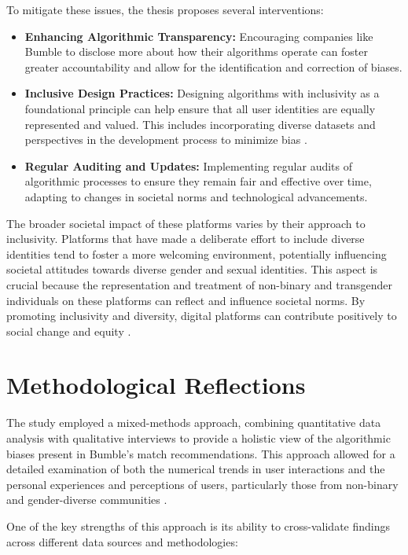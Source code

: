To mitigate these issues, the thesis proposes several interventions:
\begin{itemize}
    \item \textbf{Enhancing Algorithmic Transparency:} Encouraging companies like Bumble to disclose more about how their algorithms operate can foster greater accountability and allow for the identification and correction of biases.
    \item \textbf{Inclusive Design Practices:} Designing algorithms with inclusivity as a foundational principle can help ensure that all user identities are equally represented and valued. This includes incorporating diverse datasets and perspectives in the development process to minimize bias \cite{Costanza-Chock_2020}.
    \item \textbf{Regular Auditing and Updates:} Implementing regular audits of algorithmic processes to ensure they remain fair and effective over time, adapting to changes in societal norms and technological advancements.
\end{itemize}

The broader societal impact of these platforms varies by their approach to inclusivity. Platforms that have made a deliberate effort to include diverse identities tend to foster a more welcoming environment, potentially influencing societal attitudes towards diverse gender and sexual identities. This aspect is crucial because the representation and treatment of non-binary and transgender individuals on these platforms can reflect and influence societal norms. By promoting inclusivity and diversity, digital platforms can contribute positively to social change and equity \cite{Kalra_Gupta_Varghese_Rangaswamy_2023}.

\section{Methodological Reflections}
The study employed a mixed-methods approach, combining quantitative data analysis with qualitative interviews to provide a holistic view of the algorithmic biases present in Bumble's match recommendations. This approach allowed for a detailed examination of both the numerical trends in user interactions and the personal experiences and perceptions of users, particularly those from non-binary and gender-diverse communities \cite{Kalra_Gupta_Varghese_Rangaswamy_2023}.

One of the key strengths of this approach is its ability to cross-validate findings across different data sources and methodologies:

